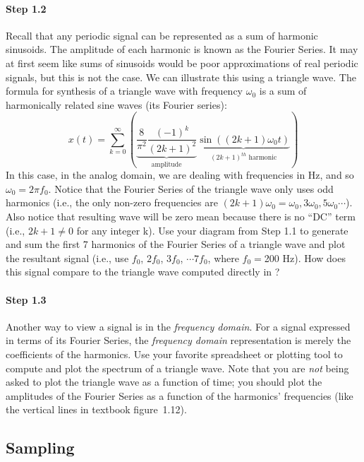 \paragraph{Step 1.2} Recall that any periodic signal can be represented as a sum of harmonic 
	sinusoids. The amplitude of each harmonic is known as the Fourier Series. It may at first seem
	like sums of sinusoids would be poor approximations of real periodic signals, but this is not 
	the case. We
 	can illustrate this using a triangle wave. The formula for synthesis of a triangle wave with 
	frequency $\omega_0$ is a sum of harmonically related sine waves (its Fourier series):
	\[
	x(t) = \sum_{k=0}^{\infty}
	\left( 
	\underbrace{ \frac{8}{\pi^2} \frac{(-1)^k}{(2k+ 1)^2} }_{ \text{amplitude} } 
	\underbrace{ \sin((2k+1)\omega_0 t) }_{ (2k+1)^{th}\text{ harmonic} } 
	\right)
	\]
	In this case, in the analog domain, we are dealing with frequencies in
	Hz, and so $\omega_0 = 2\pi f_0$. Notice that the Fourier Series of the triangle wave only uses 
	odd harmonics (i.e., the only non-zero frequencies are $(2k+1)\omega_0=\omega_0, 3\omega_0, 
	5\omega_0 \cdots$). Also notice that resulting wave will be zero mean because there is no ``DC'' 
	term (i.e., $2k+1 \neq 0$ for any integer k). 
	Use your diagram from Step 1.1 to generate and sum the
	first 7 harmonics of the Fourier Series of a triangle wave and plot the resultant signal (i.e., use 
	$f_0$, $2f_0$, $3f_0$, $\cdots 7f_0$, where $f_0=$200 Hz). How does this signal compare to 
	the triangle wave computed directly in ?
	

\paragraph{Step 1.3} Another way to view a signal is in the \emph{frequency domain}. For a 
	signal expressed in terms of its Fourier Series, the \emph{frequency domain} representation
	is merely the coefficients of the harmonics. Use your favorite spreadsheet or plotting tool to 
	compute and plot 
	the spectrum of a triangle wave.  Note that you are \emph{not} being asked to plot the triangle 
	wave as a function of time; you should plot the amplitudes of the Fourier Series as a 
	function of the harmonics' frequencies (like the vertical lines in textbook figure~1.12).  
	


\subsection{Sampling}

